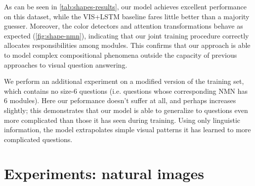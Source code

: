 As can be seen in \autoref{tab:shapes-results}, our model achieves excellent
performance on this dataset, while the VIS+LSTM baseline fares little better
than a majority guesser. Moreover, the color detectors and attention
transformations behave as expected (\autoref{fig:shape-nmn}), indicating that
our joint training procedure correctly allocates responsibilities among modules.
This confirms that our approach is able to model complex compositional phenomena
outside the capacity of previous approaches to visual question answering. 

We perform an additional experiment on a modified version of the training set,
which contains no size-6 questions (i.e. questions whose corresponding NMN has 6
modules). Here our peformance doesn't suffer at all, and perhaps increases
slightly; this demonstrates that our model is able to generalize to questions
even more complicated than those it has seen during training. Using only
linguistic information, the model extrapolates simple visual patterns it has
learned to more complicated questions.

\section{Experiments: natural images}

